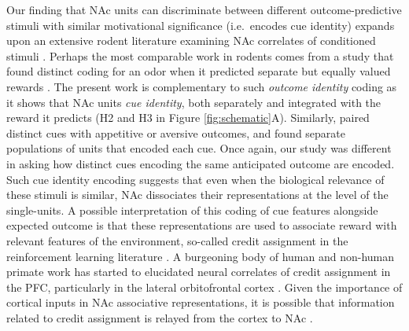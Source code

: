 \documentclass[11pt]{article}
\let\cite=\citep
\let\citeNP=\citealt
\begin{document}
{Our finding that NAc units can discriminate between different
outcome-predictive stimuli with similar motivational significance
(i.e.\ encodes cue identity) expands upon an extensive rodent
literature examining NAc correlates of conditioned stimuli
\cite{Setlow2003,Nicola2004,Yun2004,Roitman2005,Day2006,Ambroggi2008,Ishikawa2008,Roesch2009a,Saddoris2011,Goldstein2012,Lansink2012,Bissonette2013,McGinty2013,Atallah2014,Sugam2014,Cooch2015,West2016,Dejean2017}. Perhaps
the most comparable work in rodents comes from a study that found
distinct coding for an odor when it predicted separate but equally
valued rewards \cite{Cooch2015}. The present work is complementary to
such {\it outcome identity} coding as it shows that NAc units {\it cue
  identity}, both separately and integrated with the reward it
predicts (H2 and H3 in Figure \ref{fig:schematic}A). Similarly,
\citeNP{Setlow2003} paired distinct cues with appetitive or aversive
outcomes, and found separate populations of units that encoded each
cue. Once again, our study was different in asking how distinct cues
encoding the same anticipated outcome are encoded. Such cue identity
encoding suggests that even when the biological relevance of these
stimuli is similar, NAc dissociates their representations at the level
of the single-units. A possible interpretation of this coding of cue
features alongside expected outcome is that these representations are
used to associate reward with relevant features of the environment,
so-called credit assignment in the reinforcement learning literature
\cite{sutton1998}. A burgeoning body of human and non-human primate
work has started to elucidated neural correlates of credit assignment
in the PFC, particularly in the lateral orbitofrontal cortex
\cite{Chau2015,Akaishi2016,Asaad2017,Noonan2017}. Given the importance
of cortical inputs in NAc associative representations, it is possible
that information related to credit assignment is relayed from the
cortex to NAc \cite{Ishikawa2008,Cooch2015}.

}
\end{document}
